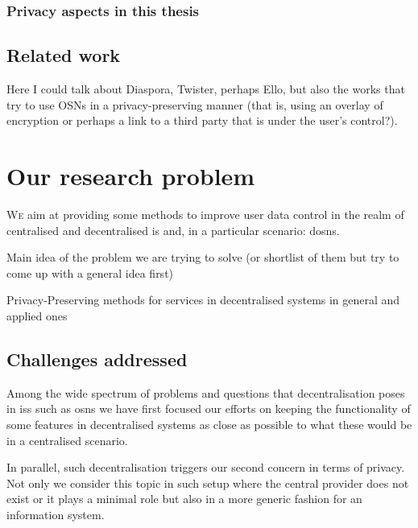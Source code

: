 \documentclass[showtrims,oldfontcommands]{kthesis}
\begin{document}
\subsection{Privacy aspects in this thesis}
    \label{subsection:privacy-aspects-in-this-thesis}


\section{Related work}
    \label{section:related-work}


Here I could talk about Diaspora, Twister, perhaps Ello, but also the works that try to 
use OSNs in a privacy-preserving manner (that is, using an overlay of encryption 
or perhaps a link to a third party that is under the user's control?).


\chapter{Our research problem}
    \label{chapter:our-research-problem}


\lettrine{\textcolor[gray]{.25}{W}}{e} aim at providing some methods to improve 
user data control in the realm of centralised and decentralised \ac{is} 
and, in a particular scenario: \aclp{dosn}.


Main idea of the problem we are trying to solve (or shortlist of them but try to come up with a general idea first)

Privacy-Preserving methods for services in decentralised systems in general and applied ones


\section{Challenges addressed}
    \label{section:challenges-addressed}
Among the wide spectrum of problems and questions that decentralisation poses in 
\acp{is} such as \acp{osn} we have first focused our efforts on keeping 
the functionality of some features in decentralised systems as close as possible to 
what these would be in a centralised scenario.

In parallel, such decentralisation triggers our second concern in terms of privacy.
Not only we consider this topic in such setup where the central provider does not 
exist or it plays a minimal role but also in a more generic fashion for an information 
system.
\end{document}
